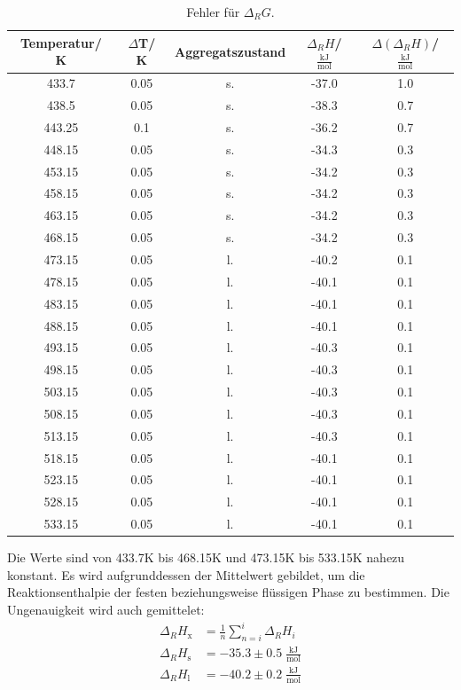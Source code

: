 \documentclass[12pt,a4paper,titlepage,headinclude,bibtotoc]{scrartcl}
\begin{document}
\begin{table}[h]
\centering
\caption{Fehler für $\Delta_R G$.}
\begin{tabular}{c|c|c|c|c}
Temperatur/ K & $\Delta$T/ K&Aggregatszustand&$\Delta_R H$/ \;$\frac{\text{kJ}}{\text{mol}}$ & $\Delta(\Delta_R H)$/ \;$\frac{\text{kJ}}{\text{mol}}$ \\
\hline
433.7 &  0.05 &  s. & -37.0 & 1.0\\
438.5 & 0.05   & s. & -38.3 &0.7 \\
443.25 & 0.1  & s. & -36.2&0.7\\
448.15 &  0.05& s. &-34.3&0.3\\
453.15 & 0.05& s. &-34.2&0.3\\
458.15 & 0.05& s. &-34.2&0.3\\
463.15 & 0.05& s. &-34.2&0.3\\
468.15 & 0.05& s. &-34.2&0.3\\
473.15 & 0.05& l. &-40.2&0.1\\
478.15 & 0.05& l. &-40.1&0.1\\
483.15 & 0.05& l. &-40.1&0.1\\
488.15 & 0.05& l. &-40.1&0.1\\
493.15 & 0.05& l. &-40.3&0.1\\
498.15 & 0.05& l. &-40.3&0.1\\
503.15 & 0.05& l. &-40.3&0.1\\
508.15 & 0.05& l. &-40.3&0.1\\
513.15 & 0.05& l. &-40.3&0.1\\
518.15 & 0.05& l. &-40.1&0.1\\
523.15 & 0.05& l. &-40.1&0.1\\
528.15 & 0.05& l. &-40.1&0.1\\
533.15 & 0.05& l. &-40.1&0.1\\
\end{tabular}
\end{table}
\FloatBarrier
Die Werte sind von 433.7\;K bis 468.15\;K und 473.15\;K bis 533.15\;K nahezu konstant. Es wird aufgrunddessen der Mittelwert gebildet, um die Reaktionsenthalpie der festen beziehungsweise flüssigen Phase zu bestimmen. Die Ungenauigkeit wird auch gemittelet:
\begin{align}
\Delta_R H_{\text{x}}&= \frac{1}{n}  \sum_{n=i}^i \Delta_R H_i  \\
\Delta_R H_{\text{s}}&= -35.3 \pm 0.5\;\frac{\text{kJ}}{\text{mol}}\\
\Delta_R H_{\text{l}}&= -40.2 \pm 0.2\;\frac{\text{kJ}}{\text{mol}}
\end{align}
\end{document}
